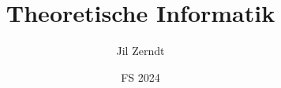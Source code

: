 \documentclass[a4paper, fontsize = 8pt, landscape]{scrartcl}
\title{Theoretische Informatik}
\author{Jil Zerndt}
\date{FS 2024}
\begin{document}
\begin{multicols*}{3}
    \thispagestyle{TitlePageStyle}
		\maketitle

    
    \raggedcolumns
    
    \raggedcolumns
    
    \raggedcolumns
    
    \raggedcolumns
    
    \raggedcolumns
    
    \raggedcolumns
    
    \raggedcolumns
    
    \raggedcolumns
    \columnbreak
    
    \raggedcolumns
    \columnbreak
    
    \raggedcolumns

\end{multicols*}
\end{document}
